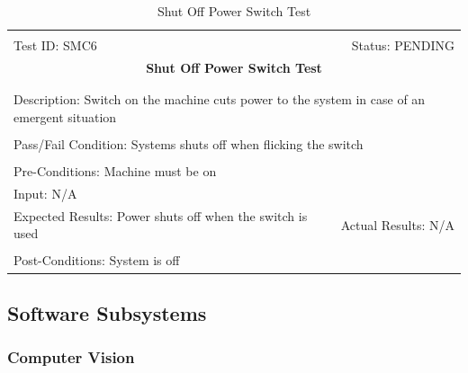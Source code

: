 \documentclass[11pt]{article}
\begin{document}
\begin{center}
\begin{table}[H]
\begin{tabular}{|l r|}\hline&\\[-2mm]
	Test ID: SMC6	&Status: PENDING\\[-3mm]
	\multicolumn{2}{|c|}{\textbf{\large{Shut Off Power Switch Test}}}\\&\\\hline&\\[-3mm]
	\multicolumn{2}{|p{\textwidth}|}{Description: Switch on the machine cuts power to the system in case of an emergent situation}\\[1mm]\hline&\\[-3mm]
	\multicolumn{2}{|p{\textwidth}|}{Pass/Fail Condition: Systems shuts off when flicking the switch}\\[1mm]\hline&\\[-3mm]
	\multicolumn{2}{|p{\textwidth}|}{Pre-Conditions: Machine must be on}\\[4mm]
	\multicolumn{2}{|p{\textwidth}|}{Input: N/A}\\[2mm]\hline
	\multicolumn{1}{|p{0.49\textwidth}}{Expected Results: Power shuts off when the switch is used
}	&\multicolumn{1}{|p{0.45\textwidth}|}{Actual Results: N/A}\\\hline&\\[-3mm]
	\multicolumn{2}{|p{\textwidth}|}{Post-Conditions: System is off}\\\hline
\end{tabular}
\caption{Shut Off Power Switch Test}
\end{table}
\end{center}

\subsection{Software Subsystems}
\subsubsection{Computer Vision}
\end{document}
